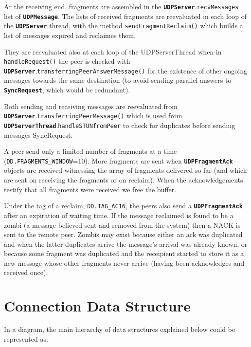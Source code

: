 \documentclass{book}
\newcommand{\cls}[1]{{\tt\bf #1}}
\newcommand{\mth}[1]{{\tt #1}}
\newcommand{\mmb}[1]{{\tt #1}}
\begin{document}
Ar the receiving end, fragments are assembled in the \cls{UDPServer}.\mth{recvMessages} list of \cls{UDPMessage}.
The lists of received fragments are reevaluated in each loop of the \cls{UDPServer} thread, with the method \mth{sendFragmentReclaim()}
which builds a list of messages expired and reclaimes them. 

They are reevaluated also at each loop of the UDPServerThread when  in \mth{handleRequest()}
the peer is checked with \cls{UDPServer}.\mth{transferringPeerAnswerMessage()} for the existence of other ongoing messages towards the same destination (to avoid sending parallel answers to \cls{SyncRequest}, which would be redundant).

Both sending and receiving messages are reevaluated from \cls{UDPServer}.\mth{transferringPeerMessage()}
which is used from \cls{UDPServerThread}.\mth{handleSTUNfromPeer} to check for duplicates before sending messages SyncRequest.

A peer send only a limited number of fragments at a time (\mmb{DD.FRAGMENTS\_WINDOW}=10).
More fragments are sent when \cls{UDPFragmentAck} objects are received witnessing the array of fragments delivered
so far (and which are sent on receiving the fragments or on reclaim).
When the acknowledgements testify that all fragments were received we free the buffer.

Under the tag of a reclaim, \mmb{DD.TAG\_AC16}, the peers also send a  \cls{UDPFragmentAck} after an expiration of waiting time.
If the message reclaimed is found to be a zombi (a message believed sent and removed from the system) then a NACK is sent
to the remote peer. Zombis may exist because either an ack was duplicated and when the latter duplicates arrive the message's
arrival was already known, or because some fragment was duplicated and the receipient started to store it as a new message
whose other fragments never arrive (having been acknowledges and received once).

\chapter{Connection Data Structure}

In a diagram, the main hierarchy of data structures explained below could be represented as:
\end{document}
